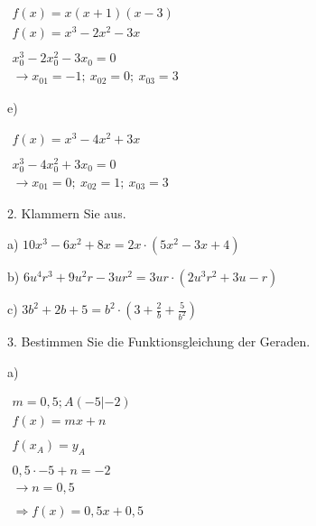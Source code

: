 \documentclass[varwidth]{article}
\begin{document}
$
\begin{array}{l}
f(x) = x(x+1)(x-3) \\
f(x) = x^3 - 2x^2 - 3x \\~\\
x_0^3 - 2x_0^2 - 3x_0 = 0 \\
\rightarrow \boxed{ x_{01}=-1;~ x_{02}=0;~ x_{03}=3 }
\end{array}
$

\vspace*{5mm}

e)

$
\begin{array}{l}
f(x) = x^3 - 4x^2 + 3x \\~\\
x_0^3 - 4x_0^2 + 3x_0 = 0 \\
\rightarrow \boxed{ x_{01} = 0;~ x_{02} = 1;~ x_{03} = 3 }
\end{array}
$

\vspace*{5mm}

{\large 2. Klammern Sie aus.}

\vspace*{5mm}

a) $\displaystyle 10x^3 - 6x^2 + 8x = 2x \cdot ( 5x^2 - 3x + 4 ) $

b) $\displaystyle 6u^4r^3 + 9u^2r - 3ur^2 = 3ur\cdot( 2u^3r^2 + 3u - r ) $

c) $\displaystyle 3b^2 + 2b + 5 = b^2 \cdot ( 3 + \frac2b + \frac5{b^2} ) $

\vspace*{5mm}

\pagebreak
{\large 3. Bestimmen Sie die Funktionsgleichung der Geraden.}

\vspace*{5mm}

a)

$
\begin{array}{l}
    m = 0,5; A(-5|-2) \\
    f(x) = mx+n \\~\\
    f(x_A) = y_A \\~\\
    0,5\cdot-5 + n = -2 \\
    \rightarrow n = 0,5 \\~\\
    \Rightarrow \boxed{f(x) = 0,5x + 0,5}
\end{array}
$

\vspace*{5mm}
\end{document}
